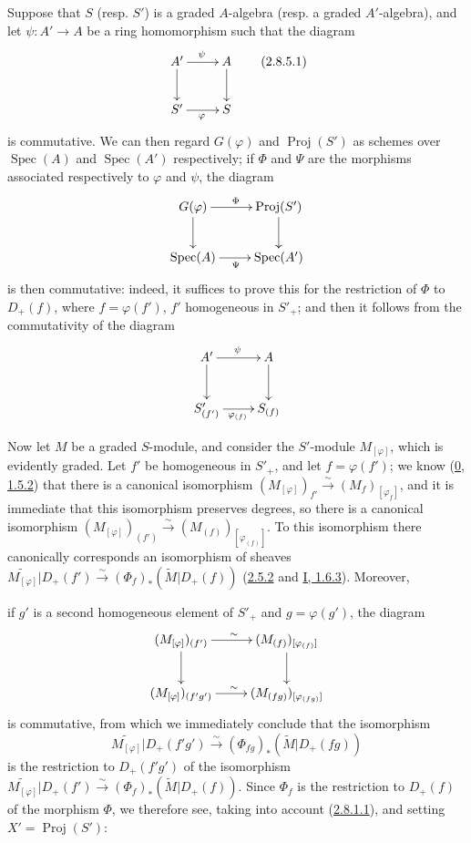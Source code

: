 \begin{env}[2.8.5]
\label{II.2.8.5}
Suppose that $S$ (resp. $S'$) is a graded $A$-algebra (resp. a graded
$A'$-algebra), and let $\psi:A'\to A$ be a ring homomorphism such that the
diagram
\[
\label{II.2.8.5.1}
  \xymatrix{
    A'\ar[r]^{\psi}\ar[d] & A\ar[d]\\
    S'\ar[r]_{\varphi} & S
  }
\tag{2.8.5.1}
\]
is commutative. We can then regard $G(\varphi)$ and
$\operatorname{Proj}(S')$ as schemes over $\operatorname{Spec}(A)$ and
$\operatorname{Spec}(A')$ respectively; if $\Phi$ and $\Psi$ are the morphisms
associated respectively to $\varphi$ and $\psi$, the diagram
\[
  \xymatrix{
    G(\varphi)\ar[r]^{\Phi}\ar[d] & \operatorname{Proj}(S')\ar[d]\\
    \operatorname{Spec}(A)\ar[r]_{\Psi} & \operatorname{Spec}(A')
  }
\]
is then commutative: indeed, it suffices to prove this for the restriction of
$\Phi$ to $D_+(f)$, where $f=\varphi(f')$, $f'$ homogeneous in $S'_+$; and
then it follows from the commutativity of the diagram
\[
  \xymatrix{
    A'\ar[r]^{\psi}\ar[d] & A\ar[d]\\
    S'_{(f')}\ar[r]_{\varphi_{(f)}} & S_{(f)}
  }
\]
\end{env}

\begin{env}[2.8.6]
\label{II.2.8.6}
Now let $M$ be a graded $S$-module, and consider the $S'$-module
$M_{[\varphi]}$, which is evidently graded. Let $f'$ be homogeneous in
$S'_+$, and let $f=\varphi(f')$; we know
(\hyperref[0.1.5.2]{0, 1.5.2}) that there is a canonical isomorphism
$(M_{[\varphi]})_{f'}\xrightarrow{\sim}(M_f)_{[\varphi_f]}$, and it is
immediate that this isomorphism preserves degrees, so there is a canonical
isomorphism
$(M_{[\varphi]})_{(f')}\xrightarrow{\sim}
(M_{(f)})_{[\varphi_{(f)}]}$. To this isomorphism there canonically
corresponds an isomorphism of sheaves
$\widetilde{M_{[\varphi]}}|D_+(f')
\xrightarrow{\sim}(\Phi_f)_*(\widetilde{M}|D_+(f))$
(\hyperref[II.2.5.2]{2.5.2} and
\hyperref[I.1.6.3]{I, 1.6.3}). Moreover,

if $g'$ is a second homogeneous element of $S'_+$ and $g=\varphi(g')$, the
diagram
\[
  \xymatrix{
    (M_{[\varphi]})_{(f')}\ar[r]^{\sim}\ar[d]
    & (M_{(f)})_{[\varphi_{(f)}]}\ar[d]\\
    (M_{[\varphi]})_{(f'g')}\ar[r]^{\sim}
    & (M_{(fg)})_{[\varphi_{(fg)}]}
  }
\]
is commutative, from which we immediately conclude that the isomorphism
\[
  \widetilde{M_{[\varphi]}}|D_+(f'g')
  \xrightarrow{\sim}(\Phi_{fg})_*(\widetilde{M}|D_+(fg))
\]
is the restriction to $D_+(f'g')$ of the isomorphism
$\widetilde{M_{[\varphi]}}|D_+(f')
\xrightarrow{\sim}(\Phi_f)_*(\widetilde{M}|D_+(f))$. Since $\Phi_f$ is the
restriction to $D_+(f)$ of the morphism $\Phi$, we therefore see, taking into
account (\hyperref[II.2.8.1.1]{2.8.1.1}), and setting
$X'=\operatorname{Proj}(S')$:
\end{env}

